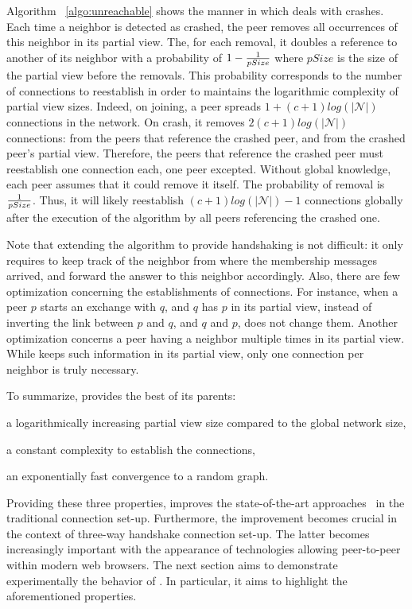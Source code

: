 \begin{asparadesc}
\item [Algorithm]~\ref{algo:unreachable} shows the manner in which \SCAMPLON{}
  deals with crashes. Each time a neighbor is detected as crashed, the peer
  removes all occurrences of this neighbor in its partial view. The, for each
  removal, it doubles a reference to another of its neighbor with a probability
  of $1-{1\over{pSize}}$ where $pSize$ is the size of the partial view before
  the removals. This probability corresponds to the number of connections to
  reestablish in order to maintains the logarithmic complexity of partial view
  sizes. Indeed, on joining, a peer spreads $1+(c+1)log(|\mathcal{N}|)$
  connections in the network. On crash, it removes $2(c+1)log(|\mathcal{N}|)$
  connections: from the peers that reference the crashed peer, and from the
  crashed peer's partial view. Therefore, the peers that reference the crashed
  peer must reestablish one connection each, one peer excepted. Without global
  knowledge, each peer assumes that it could remove it itself. The probability
  of removal is ${1\over{pSize}}$. Thus, it will likely reestablish
  $(c+1)log(|\mathcal{N}|)-1$ connections globally after the execution of the
  algorithm by all peers referencing the crashed one.
\end{asparadesc}


Note that extending the algorithm to provide handshaking is not difficult: it
only requires to keep track of the neighbor from where the membership messages
arrived, and forward the answer to this neighbor accordingly. Also, there are
few optimization concerning the establishments of connections. For instance,
when a peer $p$ starts an exchange with $q$, and $q$ has $p$ in its partial
view, instead of inverting the link between $p$ and $q$, and $q$ and $p$,
\SCAMPLON{} does not change them. Another optimization concerns a peer having a
neighbor multiple times in its partial view. While \SCAMPLON{} keeps such
information in its partial view, only one connection per neighbor is truly
necessary.

To summarize, \SCAMPLON{} provides the best of its parents:
\begin{inparaenum}[(i)]
\item a logarithmically increasing partial view size compared to the global
  network size,
\item a constant complexity to establish the connections,
\item an exponentially fast convergence to a random graph.
\end{inparaenum}
Providing these three properties, \SCAMPLON{} improves the state-of-the-art
approaches~\cite{ganesh2001scamp,voulgaris2005cyclon} in the traditional
connection set-up. Furthermore, the improvement becomes crucial in the context
of three-way handshake connection set-up.  The latter becomes increasingly
important with the appearance of technologies allowing peer-to-peer within
modern web browsers.  The next section aims to demonstrate experimentally the
behavior of \SCAMPLON{}. In particular, it aims to highlight the aforementioned
properties.


